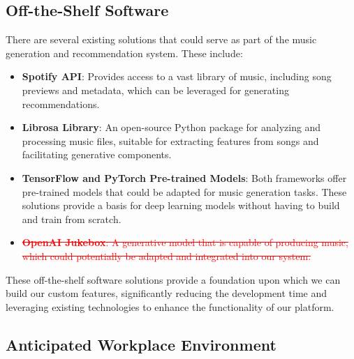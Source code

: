 \documentclass[12pt]{article}
\begin{document}
\subsection{Off-the-Shelf Software}
There are several existing solutions that could serve as part of the music generation and recommendation system. These include:

\begin{itemize}
    \item \textbf{Spotify API}: Provides access to a vast library of music, including song previews and metadata, which can be leveraged for generating recommendations.
    \item \textbf{Librosa Library}: An open-source Python package for analyzing and processing music files, suitable for extracting features from songs and facilitating generative components.
    \item \textbf{TensorFlow and PyTorch Pre-trained Models}: Both frameworks offer pre-trained models that could be adapted for music generation tasks. These solutions provide a basis for deep learning models without having to build and train from scratch.
    \item \textcolor{red}{\sout{\textbf{OpenAI Jukebox}: A generative model that is capable of producing music, which could potentially be adapted and integrated into our system.}}
\end{itemize}

These off-the-shelf software solutions provide a foundation upon which we can build our custom features, significantly reducing the development time and leveraging existing technologies to enhance the functionality of our platform.

\subsection{Anticipated Workplace Environment}
\end{document}
